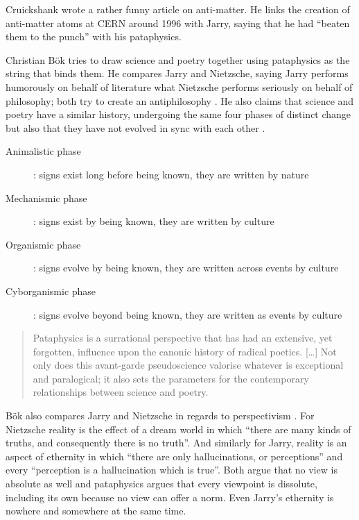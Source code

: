 Cruickshank \autocite{Cruickshank} wrote a rather funny article on anti-matter. He links the creation of anti-matter atoms at CERN around 1996 with Jarry, saying that he had ``beaten them to the punch'' with his pataphysics.

Christian Bök \autocite{Boek2002} tries to draw science and poetry together using pataphysics as the string that binds them. He compares Jarry and Nietzsche, saying Jarry performs humorously on behalf of literature what Nietzsche performs seriously on behalf of philosophy; both try to create an antiphilosophy \autocite[p.9]{Boek2002}. He also claims that science and poetry have a similar history, undergoing the same four phases of distinct change but also that they have not evolved in sync with each other \autocite[p.15]{Boek2002}.

\begin{description}
  \item [Animalistic phase]: signs exist long before being known, they are written by nature
  \item	[Mechanismic phase]: signs exist by being known, they are written by culture
  \item [Organismic phase]: signs evolve by being known, they are written across events by culture
  \item	[Cyborganismic phase]: signs evolve beyond being known, they are written as events by culture
\end{description}

\begin{quote}
  Pataphysics is a surrational perspective that has had an extensive, yet forgotten, influence upon the canonic history of radical poetics. […] Not only does this avant-garde pseudoscience valorise whatever is exceptional and paralogical; it also sets the parameters for the contemporary relationships between science and poetry. \autocite[p.27]{Boek2002}
\end{quote}

Bök also compares Jarry and Nietzsche in regards to perspectivism \autocite[p.31]{Boek2002}. For Nietzsche reality is the effect of a dream world in which ``there are many kinds of truths, and consequently there is no truth''. And similarly for Jarry, reality is an aspect of ethernity in which ``there are only hallucinations, or perceptions'' and every ``perception is a hallucination which is true''. Both argue that no view is absolute as well and pataphysics argues that every viewpoint is dissolute, including its own because no view can offer a norm. Even Jarry's ethernity is nowhere and somewhere at the same time.

